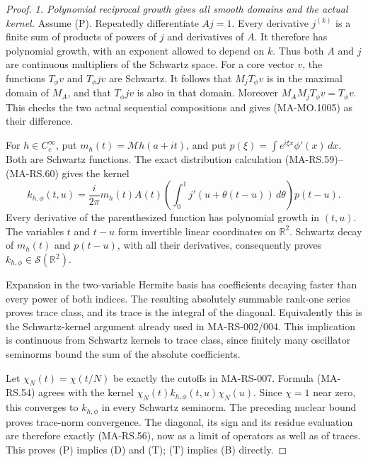 \begin{proof}
\emph{1. Polynomial reciprocal growth gives all smooth
domains and the actual kernel.}
Assume (P).  Repeatedly differentiate \(Aj=1\).
Every derivative \(j^{(k)}\) is a finite sum of products
of powers of \(j\) and derivatives of \(A\).
It therefore has polynomial growth, with an exponent
allowed to depend on \(k\).  Thus both \(A\) and \(j\)
are continuous multipliers of the Schwartz space.
For a core vector \(v\), the functions
\(T_\phi v\) and \(T_\phi jv\) are Schwartz.
It follows that \(M_jT_\phi v\) is in the maximal
domain of \(M_A\), and that \(T_\phi jv\) is also in
that domain.  Moreover
\(M_AM_jT_\phi v=T_\phi v\).
This checks the two actual sequential compositions
and gives (MA-MO.1005) as their difference.

For \(h\in C_c^\infty\), put
\(m_h(t)=\mathcal Mh(a+it)\), and put
\(p(\xi)=\int e^{i\xi x}\phi'(x)\,dx\).
Both are Schwartz functions.  The exact distribution
calculation (MA-RS.59)--(MA-RS.60) gives the kernel
\[
 k_{h,\phi}(t,u)
  =\frac{i}{2\pi}m_h(t)A(t)
       \left(\int_0^1j'(u+\theta(t-u))\,d\theta\right)
                                      p(t-u).
\tag{MA-MO.1010}
\]
Every derivative of the parenthesized function has
polynomial growth in \((t,u)\).  The variables \(t\)
and \(t-u\) form invertible linear coordinates on
\(\mathbb R^2\).  Schwartz decay of \(m_h(t)\) and
\(p(t-u)\), with all their derivatives, consequently
proves \(k_{h,\phi}\in\mathcal S(\mathbb R^2)\).

Expansion in the two-variable Hermite basis has
coefficients decaying faster than every power of
both indices.  The resulting absolutely summable
rank-one series proves trace class, and its trace
is the integral of the diagonal.  Equivalently this
is the Schwartz-kernel argument already used in
MA-RS-002/004.  This implication is continuous
from Schwartz kernels to trace class, since finitely
many oscillator seminorms bound the sum of the
absolute coefficients.

Let \(\chi_N(t)=\chi(t/N)\) be exactly the cutoffs
in MA-RS-007.  Formula (MA-RS.54) agrees with
the kernel \(\chi_N(t)k_{h,\phi}(t,u)\chi_N(u)\).
Since \(\chi=1\) near zero, this converges to
\(k_{h,\phi}\) in every Schwartz seminorm.
The preceding nuclear bound proves trace-norm
convergence.  The diagonal, its sign and its
residue evaluation are therefore exactly
(MA-RS.56), now as a limit of operators as well
as of traces.  This proves (P) implies (D) and (T);
(T) implies (B) directly.


\end{proof}
